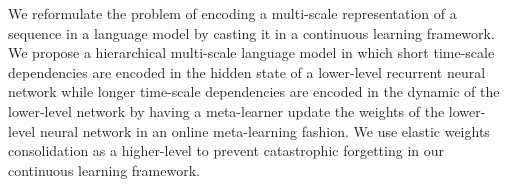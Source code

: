 We reformulate the problem of encoding a multi-scale representation of a sequence  in a language model by casting it in a continuous learning framework. We propose a hierarchical multi-scale language model in which short time-scale dependencies are encoded in the hidden state of a lower-level recurrent neural network while longer time-scale dependencies are encoded in the dynamic of the lower-level network by having a meta-learner update the weights of the lower-level neural network in an online meta-learning fashion. We use elastic weights consolidation as a higher-level to prevent catastrophic forgetting in our continuous learning framework.
